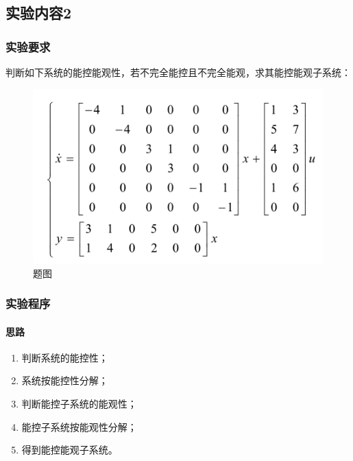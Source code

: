 \documentclass[UTF8]{article}
\begin{document}
\subsection{实验内容2}
\subsubsection{实验要求}

判断如下系统的能控能观性，若不完全能控且不完全能观，求其能控能观子系统：
\begin{figure}[H]
    \centering %
    \includegraphics[width=.6\textwidth]{figure/exp2_2.png} 
    \caption{题图} %
\end{figure}


\subsubsection{实验程序}
\paragraph{思路}
\begin{enumerate}
    \item 判断系统的能控性；
    \item 系统按能控性分解；
    \item 判断能控子系统的能观性；
    \item 能控子系统按能观性分解；
    \item 得到能控能观子系统。
\end{enumerate}
\end{document}
